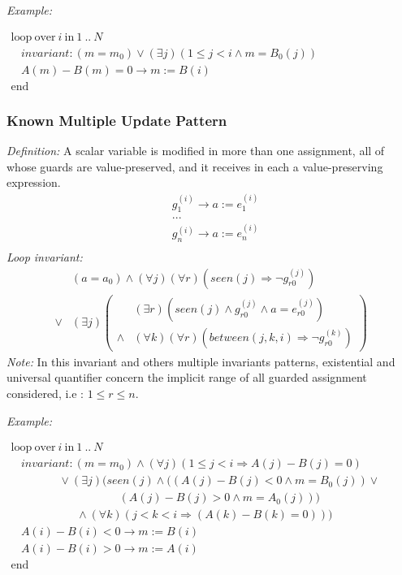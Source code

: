 \documentclass[a4paper,10pt]{article}
\newcommand{\idx}{\ensuremath{i}\xspace}
\newcommand{\at}[1]{{(#1)}}
\newcommand{\KWloop}{\ensuremath{\mathrm{loop}~}}
\newcommand{\KWend}{\ensuremath{\mathrm{end}~}}
\newcommand{\KWover}{\ensuremath{\mathrm{over}~}}
\newcommand{\KWin}{\ensuremath{~\mathrm{in}~}}
\newcommand{\impl}{\ensuremath{\Longrightarrow}}
\newcommand{\seen}[1]{\ensuremath{\mathit{seen}(#1)}\xspace}
\newcommand{\between}[3]{\ensuremath{\mathit{between}{(#1,#2,#3)}}\xspace}
\newcommand{\loopinvariant}{\noindent\textit{Loop invariant:}\xspace}
\newcommand{\patterndef}{\noindent\textit{Definition:}\xspace}
\newcommand{\patternexample}{\noindent\textit{Example:}\xspace}
\newcommand{\patternnote}{\noindent\textit{Note:}\xspace}
\begin{document}
\bigskip
\patternexample

\medskip
$\begin{array}{l}
  \KWloop \KWover i \KWin 1~..~N \\
  ~~~~ \textit{invariant}: (m = m_0) \lor (\exists j)(1\leq j < i \land m = B_0(j))\\
  ~~~~ A(m)-B(m)=0 \rightarrow m := B(i)\\
  \KWend
\end{array}$

\subsubsection*{Known Multiple Update Pattern}

\patterndef A scalar variable is modified in more than one assignment, all of
whose guards are value-preserved, and it receives in each a value-preserving expression.
%
\begin{eqnarray*}
&g_1^\at{\idx} \rightarrow a := e_1^\at{\idx}\\
&...\\
&g_n^\at{\idx} \rightarrow a := e_n^\at{\idx}\\
\end{eqnarray*}
%
\loopinvariant
%
\begin{eqnarray*}
&(a = a_0) \land (\forall j)(\forall r)(\seen{j} \impl \neg g_{r0}^\at{j})\\
\lor 
& (\exists j)
\left(\begin{array}{cl}
&(\exists r)(\seen{j} \land g_{r0}^\at{j} \land a = e_{r0}^\at{j})\\
\land&  (\forall k)(\forall r) (\between{j}{k}{\idx} \impl \neg g_{r0}^\at{k})
\end{array}\right)
\end{eqnarray*}
%
\patternnote In this invariant and others multiple invariants patterns, 
existential and universal quantifier concern the implicit range of all 
guarded assignment considered, i.e : $1 \leq r \leq n$.

\bigskip
\patternexample

\medskip
$\begin{array}{l}
  \KWloop \KWover i \KWin 1~..~N \\
  ~~~~ \textit{invariant}: (m = m_0) \land (\forall j)(1\leq j < i \impl A(j)-B(j)=0)\\
  ~~~~~~~~~~~~~~~~~~~ \lor (\exists j)(\seen{j} \land ((A(j)-B(j) < 0 \land m = B_0(j)) \lor\\
  ~~~~~~~~~~~~~~~~~~~~~~~~~~~~~~~~~~~~~~~~~~~ (A(j)-B(j) > 0 \land m = A_0(j)))\\
  ~~~~~~~~~~~~~~~~~~~~~~~~~~ \land (\forall k)(j < k < i \impl (A(k)-B(k) = 0)))\\
  ~~~~ A(i)-B(i) < 0 \rightarrow m := B(i)\\
  ~~~~ A(i)-B(i) > 0 \rightarrow m := A(i)\\
  \KWend
\end{array}$
\end{document}
